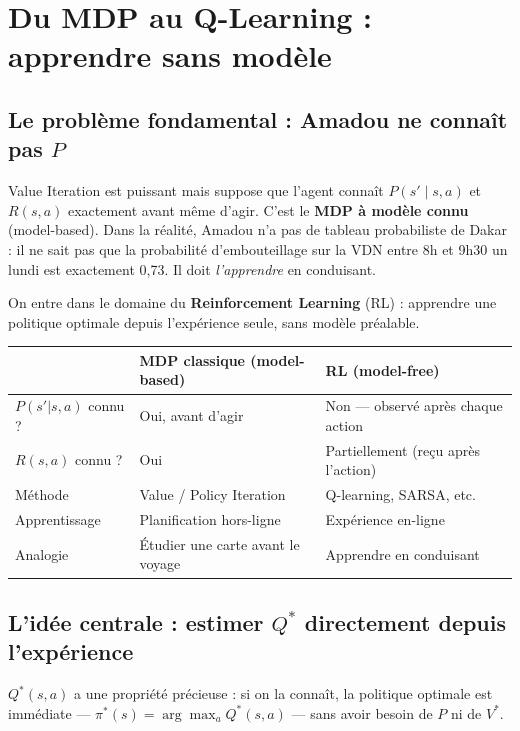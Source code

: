 \documentclass[11pt,a4paper]{article}
\begin{document}
\section{Du MDP au Q-Learning : apprendre sans modèle}
\label{sec:qlearning}

\subsection{Le problème fondamental : Amadou ne connaît pas $P$}

Value Iteration est puissant mais suppose que l'agent connaît $P(s' \mid s,a)$ et $R(s,a)$ exactement avant même d'agir. C'est le \textbf{MDP à modèle connu} (model-based). Dans la réalité, Amadou n'a pas de tableau probabiliste de Dakar : il ne sait pas que la probabilité d'embouteillage sur la VDN entre 8h et 9h30 un lundi est exactement 0,73. Il doit \textit{l'apprendre} en conduisant.

On entre dans le domaine du \textbf{Reinforcement Learning} (RL) : apprendre une politique optimale depuis l'expérience seule, sans modèle préalable.

\begin{center}
\renewcommand{\arraystretch}{1.4}
\begin{tabular}{lll}
\toprule
& \textbf{MDP classique (model-based)} & \textbf{RL (model-free)} \\
\midrule
$P(s'|s,a)$ connu ? & Oui, avant d'agir & Non --- observé après chaque action \\
$R(s,a)$ connu ? & Oui & Partiellement (reçu après l'action) \\
Méthode & Value / Policy Iteration & Q-learning, SARSA, etc. \\
Apprentissage & Planification hors-ligne & Expérience en-ligne \\
Analogie & Étudier une carte avant le voyage & Apprendre en conduisant \\
\bottomrule
\end{tabular}
\end{center}

\subsection{L'idée centrale : estimer $Q^*$ directement depuis l'expérience}

$Q^*(s,a)$ a une propriété précieuse : si on la connaît, la politique optimale est immédiate --- $\pi^*(s) = \arg\max_a Q^*(s,a)$ --- sans avoir besoin de $P$ ni de $V^*$.
\end{document}
